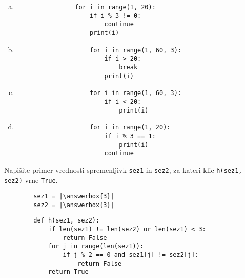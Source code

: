 \documentclass[arhiv, 10pt]{../izpit}
\newcommand{\inlinepy}[1]{\texttt{#1}}
\newcommand{\answerbox}[1]{\framebox{\vphantom{\large M}\hspace{#1cm}}}
\begin{document}
        \begin{multicols}{2}
        \begin{enumerate}[(a)]
\item 
            \begin{verbatim}
                for i in range(1, 20):
                    if i % 3 != 0:
                        continue
                    print(i)
            \end{verbatim}
        
\item 
                \begin{verbatim}
                    for i in range(1, 60, 3):
                        if i > 20:
                            break
                        print(i)
                \end{verbatim}
            
\item 
                \begin{verbatim}
                    for i in range(1, 60, 3):
                        if i < 20:
                            print(i)
                \end{verbatim}
            
\item 
                \begin{verbatim}
                    for i in range(1, 20):
                        if i % 3 == 1:
                            print(i)
                        continue
                \end{verbatim}
            
\end{enumerate}

        \end{multicols}
    
        \naloga*
        \begin{multicols}{2}
        \noindent
        Napišite primer vrednosti spremenljivk \inlinepy{sez1} in \inlinepy{sez2}, za kateri klic \inlinepy{h(sez1, sez2)} vrne \inlinepy{True}.
        \begin{verbatim}
        sez1 = |\answerbox{3}|
        sez2 = |\answerbox{3}|
        \end{verbatim}
        \vfil
        \columnbreak
        \begin{verbatim}
        def h(sez1, sez2):
            if len(sez1) != len(sez2) or len(sez1) < 3:
                return False
            for j in range(len(sez1)):
                if j % 2 == 0 and sez1[j] != sez2[j]:
                    return False
            return True
        \end{verbatim}
        \end{multicols}
    
\end{document}
